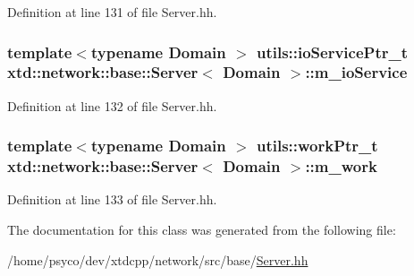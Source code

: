 Definition at line 131 of file Server.\+hh.

\subsubsection[{\texorpdfstring{m\+\_\+io\+Service}{m_ioService}}]{\setlength{\rightskip}{0pt plus 5cm}template$<$typename Domain $>$ {\bf utils\+::io\+Service\+Ptr\+\_\+t} {\bf xtd\+::network\+::base\+::\+Server}$<$ Domain $>$\+::m\+\_\+io\+Service\hspace{0.3cm}{\ttfamily [protected]}}\hypertarget{classxtd_1_1network_1_1base_1_1Server_a2b67486dfc934466300fa48295f94b46}{}\label{classxtd_1_1network_1_1base_1_1Server_a2b67486dfc934466300fa48295f94b46}


Definition at line 132 of file Server.\+hh.

\subsubsection[{\texorpdfstring{m\+\_\+work}{m_work}}]{\setlength{\rightskip}{0pt plus 5cm}template$<$typename Domain $>$ {\bf utils\+::work\+Ptr\+\_\+t} {\bf xtd\+::network\+::base\+::\+Server}$<$ Domain $>$\+::m\+\_\+work\hspace{0.3cm}{\ttfamily [protected]}}\hypertarget{classxtd_1_1network_1_1base_1_1Server_ad762843698e4e7b4e70974c2daab0932}{}\label{classxtd_1_1network_1_1base_1_1Server_ad762843698e4e7b4e70974c2daab0932}


Definition at line 133 of file Server.\+hh.



The documentation for this class was generated from the following file\+:\begin{DoxyCompactItemize}
\item 
/home/psyco/dev/xtdcpp/network/src/base/\hyperlink{base_2Server_8hh}{Server.\+hh}\end{DoxyCompactItemize}
